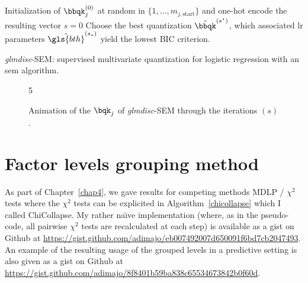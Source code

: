 \begin{algorithm}[H]
 Initialization of $\bbqk_j^{(0)}$ at random in $\{1, \dots, m_{j,\text{start}}\}$ and one-hot encode the resulting vector\;
 $s = 0$\;
 Choose the best quantization $\hat{\bbqk}^{(s^\star)}$, which associated \gls{lr} parameters $\hat{\gls{bth}}^{(s_\star)}$ yield the lowest BIC criterion.
 \caption{\label{SEM-disc} \textit{glmdisc}-SEM: supervised multivariate quantization for logistic regression with an \gls{sem} algorithm.}
\end{algorithm}

\begin{figure}[!h]
\begin{animateinline}[poster=first, controls=all, palindrome, autopause, autoresume, width=\textwidth, height=9.5cm]{5}
%
\end{animateinline}
\caption{\label{fig:animSEM} Animation of the $\bqk_j$ of \textit{glmdisc}-SEM through the iterations $(s)$.}
\end{figure}



\section{Factor levels grouping method} \label{app1:chicollapse}

As part of Chapter~\ref{chap4}, we gave results for competing methods MDLP / $\chi^2$ tests where the $\chi^2$ tests can be explicited in Algorithm~\ref{chicollapse} which I called ChiCollapse. My rather na{\"\i}ve implementation (where, as in the pseudo-code, all pairwise $\chi^2$ tests are recalculated at each step) is available as a gist on Github at \url{https://gist.github.com/adimajo/eb007492007d650091f6bd7cb2047493}. An example of the resulting usage of the grouped levels in a predictive setting is also given as a gist on Github at \url{https://gist.github.com/adimajo/8f8401b59ba838c65534673842b0f60d}.

